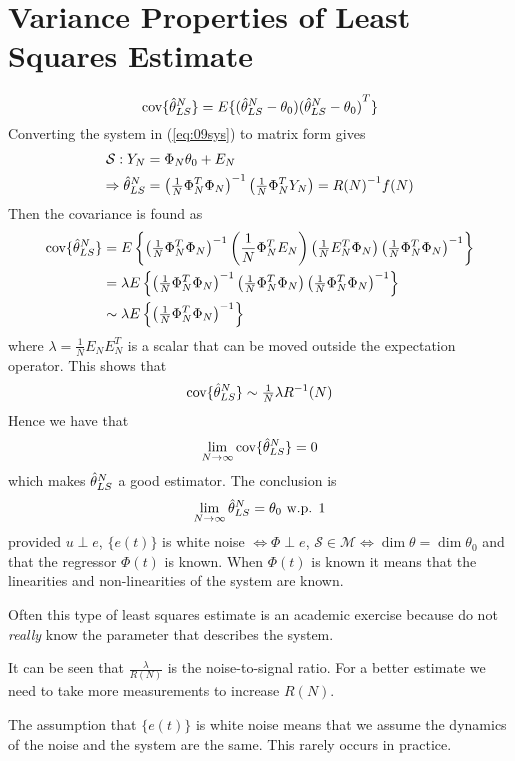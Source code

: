 \section{Variance Properties of Least Squares Estimate}
$$\text{cov}\{\hat{\theta}_{LS}^N\} = E\{(\hat{\theta}_{LS}^N-\theta_0){(\hat{\theta}_{LS}^N-\theta_0)}^T\}$$
Converting the system in (\ref{eq:09sys}) to matrix form gives
\begin{align*}
\mathcal{S}: Y_N &= \Phi_N\theta_0+E_N \\
\Rightarrow \hat{\theta}_{LS}^N &= {\left(\tfrac{1}{N}\Phi_N^T\Phi_N\right)}^{-1}\left(\tfrac{1}{N}\Phi_N^T Y_N\right) = R{(N)}^{-1}f(N)
\end{align*}
Then the covariance is found as
\begin{align*}
\text{cov}\{\hat{\theta}_{LS}^N\} &= E\left\lbrace{\left(\tfrac{1}{N}\Phi_N^T\Phi_N\right)}^{-1} \left(\frac{1}{N}\Phi_N^T E_N\right)
                        \left(\tfrac{1}{N}E_N^T\Phi_N\right) {\left(\tfrac{1}{N}\Phi_N^T\Phi_N\right)}^{-1}\right\rbrace \\
                   &= \lambda E\left\lbrace{\left(\tfrac{1}{N}\Phi_N^T\Phi_N\right)}^{-1} \left(\tfrac{1}{N}\Phi_N^T\Phi_N\right)
                      {\left(\tfrac{1}{N}\Phi_N^T\Phi_N\right)}^{-1}\right\rbrace \\
                   &\sim \lambda E\left\lbrace{\left(\tfrac{1}{N}\Phi_N^T\Phi_N\right)}^{-1}\right\rbrace
\end{align*}
where $\lambda = \frac{1}{N}E_N E_N^T$ is a scalar that can be moved outside the expectation operator.
This shows that
$$\text{cov}\{\hat{\theta}_{LS}^N\} \sim \tfrac{1}{N}\lambda R^{-1}(N)$$
Hence we have that
$$\lim_{N\to\infty}\text{cov}\{\hat{\theta}_{LS}^N\} = 0$$
which makes $\hat{\theta}_{LS}^N$ a good estimator.
The conclusion is
$$\lim_{N\to\infty}\hat{\theta}_{LS}^N = \theta_0 \text{ w.p. } 1$$
provided $u\perp e$, $\{e(t)\}$ is white noise $\Leftrightarrow \Phi\perp e$, $\mathcal{S}\in\mathcal{M} \Leftrightarrow \dim\theta = \dim\theta_0$ and that the regressor $\Phi(t)$ is known.
When $\Phi(t)$ is known it means that the linearities and non-linearities of the system are known.

Often this type of least squares estimate is an academic exercise because do not \textit{really} know the parameter that describes the system.

It can be seen that $\frac{\lambda}{R(N)}$ is the noise-to-signal ratio.
For a better estimate we need to take more measurements to increase $R(N)$.

The assumption that $\{e(t)\}$ is white noise means that we assume the dynamics of the noise and the system are the same.
This rarely occurs in practice.

